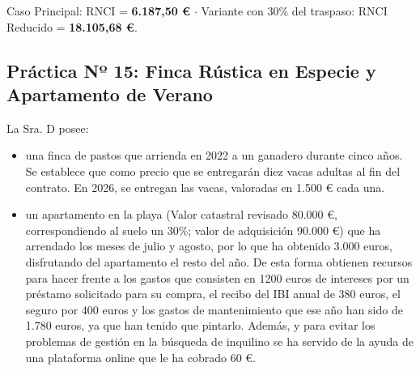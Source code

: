 \documentclass[11pt,a4paper,openany]{article}
\begin{document}
\begin{resultadoBox}
Caso Principal: RNCI = \textbf{6.187,50 \euro} $\cdot$ Variante con 30\% del traspaso: RNCI Reducido = \textbf{18.105,68 \euro}.
\end{resultadoBox}

\newpage

\subsection{Práctica Nº 15: Finca Rústica en Especie y Apartamento de Verano}

\begin{enunciadoBox}
La Sra. D posee:
\begin{itemize}[leftmargin=1.5em]
    \item una finca de pastos que arrienda en 2022 a un ganadero durante cinco años. Se establece que como precio que se entregarán diez vacas adultas al fin del contrato. En 2026, se entregan las vacas, valoradas en 1.500 \euro{} cada una.
    \item un apartamento en la playa (Valor catastral revisado 80.000 \euro{}, correspondiendo al suelo un 30\%; valor de adquisición 90.000 \euro{}) que ha arrendado los meses de julio y agosto, por lo que ha obtenido 3.000 euros, disfrutando del apartamento el resto del año. De esta forma obtienen recursos para hacer frente a los gastos que consisten en 1200 euros de intereses por un préstamo solicitado para su compra, el recibo del IBI anual de 380 euros, el seguro por 400 euros y los gastos de mantenimiento que ese año han sido de 1.780 euros, ya que han tenido que pintarlo. Además, y para evitar los problemas de gestión en la búsqueda de inquilino se ha servido de la ayuda de una plataforma online que le ha cobrado 60 \euro{}.
\end{itemize}
\end{enunciadoBox}
\end{document}
